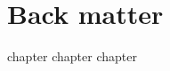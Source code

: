 
  \part{Back matter}

{chapter}
{chapter}
{chapter}


\begin{small}
  \printbibliography
\end{small}




\printindex
